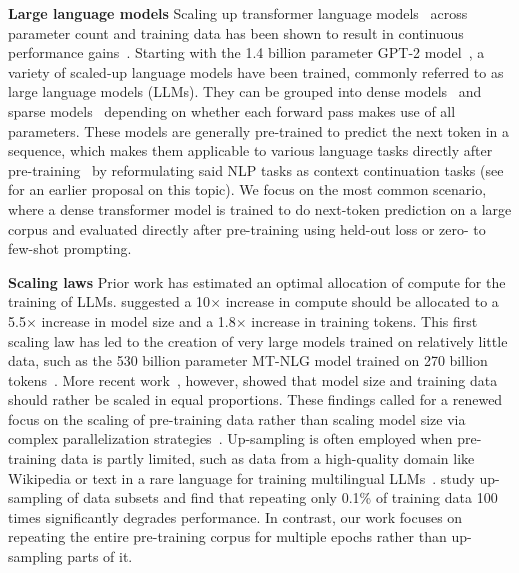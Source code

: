 \documentclass{article}
\begin{document}
\textbf{Large language models} Scaling up transformer language models~\cite{vaswani2017attention} across parameter count and training data has been shown to result in continuous performance gains~\cite{chowdhery2022palm}. Starting with the 1.4 billion parameter GPT-2 model~\cite{radford2019language}, a variety of scaled-up language models have been trained, commonly referred to as large language models (LLMs). They can be grouped into dense models~\cite{brown2020language,Khrushchev_YaLM_100B_2022,lieber2021jurassic,rae2021scaling,chung2022scaling,black2022gpt,zhang2022opt,thoppilan2022lamda,su2022welm,taylor2022galactica,zeng2022glm,scao2022bloom,li2023starcoder,luukkonen2023fingpt} and sparse models~\cite{fedus2021switch,zeng2021pangu,du2022glam,zoph2022designing} depending on whether each forward pass makes use of all parameters. These models are generally pre-trained to predict the next token in a sequence, which makes them applicable to various language tasks directly after pre-training~\cite{brown2020language,wei2022chain,kojima2022large,muennighoff2022sgpt,srivastava2022beyond} by reformulating said NLP tasks as context continuation tasks (see~\cite{DBLP:journals/corr/abs-1806-08730} for an earlier proposal on this topic). We focus on the most common scenario, where a dense transformer model is trained to do next-token prediction on a large corpus and evaluated directly after pre-training using held-out loss or zero- to few-shot prompting.

\noindent

\textbf{Scaling laws} 
Prior work has estimated an optimal allocation of compute for the training of LLMs. \citet{kaplan2020scaling} suggested a 10$\times$ increase in compute should be allocated to a 5.5$\times$ increase in model size and a 1.8$\times$ increase in training tokens. This first scaling law has led to the creation of very large models trained on relatively little data, such as the 530 billion parameter MT-NLG model trained on 270 billion tokens~\cite{smith2022using}. More recent work~\cite{hoffmann2022training}, however, showed that model size and training data should rather be scaled in equal proportions. These findings called for a renewed focus on the scaling of pre-training data rather than scaling model size via complex parallelization strategies~\cite{shoeybi2019megatron,rasley2020deepspeed,bian2021colossal,narayanan2021efficient}. Up-sampling is often employed when pre-training data is partly limited, such as data from a high-quality domain like Wikipedia or text in a rare language for training multilingual LLMs~\cite{lin2021few,orlanski2023measuring}. \citet{hernandez2022scaling} study up-sampling of data subsets and find that repeating only 0.1\% of training data 100 times significantly degrades performance. In contrast, our work focuses on repeating the entire pre-training corpus for multiple epochs rather than up-sampling parts of it.
\end{document}
